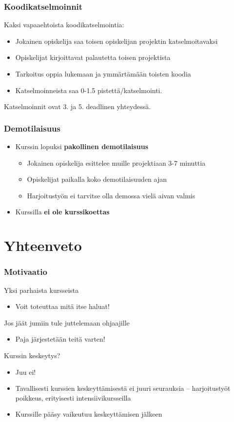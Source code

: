 \documentclass[finnish]{beamer}
\begin{document}
	\begin{frame}
		\frametitle{Koodikatselmoinnit}
		
		Kaksi vapaaehtoista koodikatselmointia:
		\begin{itemize}
			\item Jokainen opiskelija saa toisen opiskelijan projektin katselmoitavaksi
			\item Opiskelijat kirjoittavat palautetta toisen projektista
			\item Tarkoitus oppia lukemaan ja ymmärtämään toisten koodia
			\item Katselmoinneista saa 0-1.5 pistettä/katselmointi.
		\end{itemize}
		Katselmoinnit ovat 3. ja 5. deadlinen yhteydessä.
	\end{frame}
	
	\begin{frame}
		\frametitle{Demotilaisuus}
		\begin{itemize}
			\item Kurssin lopuksi \textbf{pakollinen demotilaisuus}
			\begin{itemize}
				\item Jokainen opiskelija esittelee muille projektiaan 3-7 minuttia
				\item Opiskelijat paikalla koko demotilaisuuden ajan
				\item Harjoitustyön ei tarvitse olla demossa vielä aivan valmis
			\end{itemize}
			\item Kurssilla \textbf{ei ole kurssikoettas}
		\end{itemize}
	\end{frame}
	
	\section{Yhteenveto}
	
	\begin{frame}
		\frametitle{Motivaatio}

		Yksi parhaista kursseista
		\begin{itemize}
			\item Voit toteuttaa mitä itse haluat!
		\end{itemize}		
		
		Jos jäät jumiin tule juttelemaan ohjaajille
		\begin{itemize}
			\item Paja järjestetään teitä varten!
		\end{itemize}
		
		Kurssin keskeytys?
		\begin{itemize}
			\item Juu ei!
			\item Tavallisesti kurssien keskeyttämisestä ei juuri seurauksia -- harjoitustyöt poikkeus, erityisesti intensiivikursseilla
			\item Kurssille pääsy vaikeutuu keskeyttämisen jälkeen
		\end{itemize}
	\end{frame}
	
\end{document}
